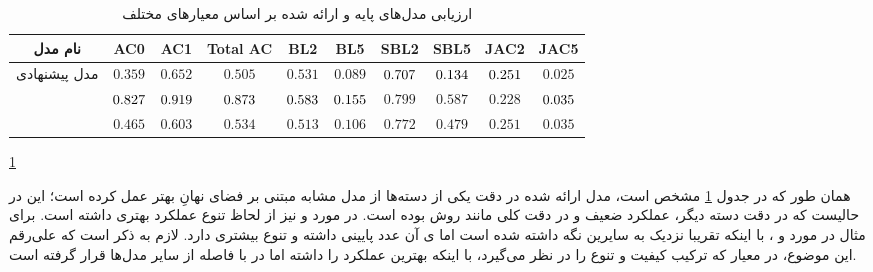 \begin{table}[!htb]
    \centering
    \caption{}\label{}
    \small\tabcolsep=0.07cm
    \begin{tabular}{||c||c c c|c c|c c|c c||}\hline\hline نام مدل	& AC0	& AC1	& Total AC	& BL2	& BL5	& SBL2	& SBL5	& JAC2	& JAC5\\
        \hline\hline
        مدل پیشنهادی
        	& $0.359$	& $0.652$	& $0.505$	& $0.531$	& $0.089$	& $\cellcolor{gray!25}0.707$	& $\cellcolor{gray!25}0.134$	& $\cellcolor{gray!25}0.251$	& $0.025$ \\
        \hline
        \sentigan{}	& $\cellcolor{gray!25}0.827$	& $\cellcolor{gray!25}0.919$	& $\cellcolor{gray!25}0.873$	& $\cellcolor{gray!25}0.583$	& $\cellcolor{gray!25}0.155$	& $0.799$	& $0.587$	& $0.228$	& $\cellcolor{gray!25}0.035$ \\
        \hline
        \towardctg{}	& $0.465$	& $0.603$	& $0.534$	& $0.513$	& $0.106$	& $0.772$	& $0.479$	& $0.251$	& $0.035$ \\
        \hline
        \hline\end{tabular}\normalsize 
	\caption{ارزیابی مدل‌های پایه و ارائه شده بر اساس معیار‌های مختلف}\label{table:mr15_result}
    \ref{table:mr15_result}
\end{table}
همان طور که در جدول \ref{table:mr15_result} مشخص است، مدل ارائه شده در دقت یکی از دسته‌ها از مدل مشابه مبتنی بر فضای نهانِ \towardctg{} بهتر عمل کرده است؛ این در حالیست که در دقت دسته دیگر، عملکرد ضعیف و در دقت کلی مانند روش \towardctg{} بوده است. در مورد \bleu{} و \selfbleu{} نیز از لحاظ تنوع عملکرد بهتری داشته است. برای مثال در مورد \bleu[-5]{} و \selfbleu[-5]{}، با اینکه \bleu{} تقریبا نزدیک به سایرین نگه داشته شده است اما \selfbleu{}ی آن عدد پایینی داشته و تنوع بیشتری دارد. لازم به ذکر است که علی‌رقم این موضوع، در معیار \jaccard{} که ترکیب کیفیت و تنوع را در نظر می‌گیرد، با اینکه بهترین عملکرد \jaccard[-2]{} را داشته اما در \jaccard[-5]{} با فاصله از سایر مدل‌ها قرار گرفته است.

